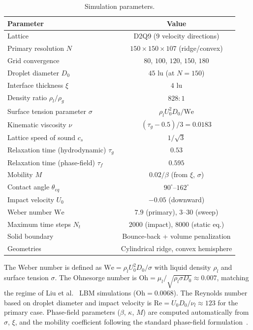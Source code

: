 \begin{table}[h]
\centering
\caption{Simulation parameters.}
\label{tab:sim_params}
\begin{tabular}{lc}
\hline
Parameter & Value \\
\hline
Lattice & D2Q9 ($9$ velocity directions) \\
Primary resolution $N$ & $150 \times 150 \times 107$ (ridge/convex) \\
Grid convergence & $80$, $100$, $120$, $150$, $180$ \\
Droplet diameter $D_0$ & $45$ lu (at $N=150$) \\
Interface thickness $\xi$ & $4$ lu \\
Density ratio $\rho_l/\rho_g$ & $828:1$ \\
Surface tension parameter $\sigma$ & $\rho_l U_0^2 D_0 / \mathrm{We}$ \\
Kinematic viscosity $\nu$ & $(\tau_g - 0.5)/3 = 0.0183$ \\
Lattice speed of sound $c_s$ & $1/\sqrt{3}$ \\
Relaxation time (hydrodynamic) $\tau_g$ & $0.53$ \\
Relaxation time (phase-field) $\tau_f$ & $0.595$ \\
Mobility $M$ & $0.02 / \beta$ (from $\xi$, $\sigma$) \\
Contact angle $\theta_{eq}$ & $90^\circ$--$162^\circ$ \\
Impact velocity $U_0$ & $-0.05$ (downward) \\
Weber number $\mathrm{We}$ & $7.9$ (primary), $3$--$30$ (sweep) \\
Maximum time steps $N_t$ & $2000$ (impact), $8000$ (static eq.) \\
Solid boundary & Bounce-back + volume penalization \\
Geometries & Cylindrical ridge, convex hemisphere \\
\hline
\end{tabular}
\end{table}

The Weber number is defined as $\mathrm{We} = \rho_l U_0^2 D_0 / \sigma$ with liquid density $\rho_l$ and surface tension $\sigma$. The Ohnesorge number is $\mathrm{Oh} = \mu_l / \sqrt{\rho_l \sigma D_0} \approx 0.007$, matching the regime of Liu et al.~\cite{liu2015symmetry} LBM simulations ($\mathrm{Oh} = 0.0068$). The Reynolds number based on droplet diameter and impact velocity is $\mathrm{Re} = U_0 D_0 / \nu_l \approx 123$ for the primary case. Phase-field parameters ($\beta$, $\kappa$, $M$) are computed automatically from $\sigma$, $\xi$, and the mobility coefficient following the standard phase-field formulation~\cite{ding2007lattice}.

